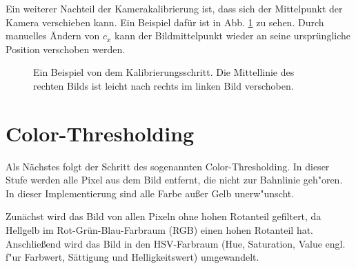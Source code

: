 \documentclass[arbeit=studie,oneside,BCOR=12mm]{ArbeitRST}
\begin{document}
Ein weiterer Nachteil der Kamerakalibrierung ist, dass sich der Mittelpunkt der
Kamera verschieben kann. Ein Beispiel dafür ist in Abb. \ref{shifted} zu sehen. Durch
manuelles Ändern von $c_x$ kann der Bildmittelpunkt wieder an seine
ursprüngliche Position verschoben werden. 

\begin{figure}[h]
    \centering
    \caption{Ein Beispiel von dem Kalibrierungsschritt. Die Mittellinie des
    rechten Bilds ist leicht nach rechts im linken Bild verschoben.}
    \label{shifted}
\end{figure}

\section{\glqq Color-Thresholding\grqq}

Als Nächstes folgt der Schritt des sogenannten \glqq Color-Thresholding\grqq. In dieser
Stufe werden alle Pixel aus dem Bild entfernt, die nicht zur Bahnlinie geh"oren.
In dieser Implementierung sind alle Farbe au{\ss}er Gelb unerw"unscht.

Zunächst wird das Bild von allen Pixeln ohne hohen Rotanteil gefiltert, da
Hellgelb im Rot-Grün-Blau-Farbraum (RGB) einen hohen Rotanteil hat.
Anschließend wird das Bild in den HSV-Farbraum (Hue, Saturation, Value engl. f"ur Farbwert, Sättigung und
Helligkeitswert) umgewandelt. 
\end{document}
